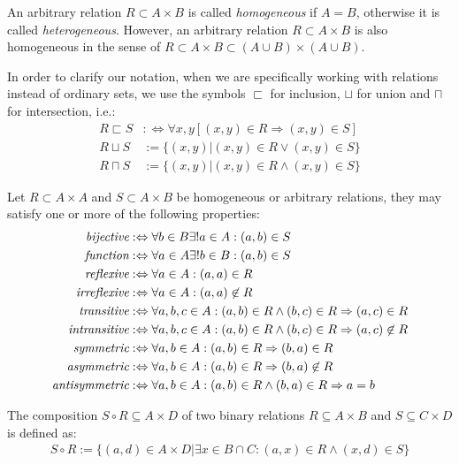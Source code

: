 An arbitrary relation $R \subset A \times B$ is called \emph{homogeneous} if $A = B$, otherwise it is called \emph{heterogeneous}.
However, an arbitrary relation $R \subset A \times B$ is also homogeneous in the sense of
$R \subset A \times B \subset (A \cup B) \times (A \cup B)$.

In order to clarify our notation, when we are specifically working with relations instead of ordinary sets, we use the symbols
$\sqsubset$ for inclusion, $\sqcup$ for union and $\sqcap$ for intersection, i.e.:
\begin{align}
R \sqsubset S
&:\Leftrightarrow
\forall x,y [(x,y) \in R \Rightarrow (x,y) \in S]
\\
R \sqcup S
&:=
\{ (x,y) | (x,y) \in R \vee (x,y) \in S \}
\\
R \sqcap S
&:=
\{ (x,y) | (x,y) \in R \wedge (x,y) \in S \}
\end{align}

\begin{definition}
Let $R \subset A \times A$ and $S \subset A \times B$ be homogeneous or arbitrary relations, they may satisfy one or more of the following properties:
\begin{align}
\emph{bijective} 
&:\Leftrightarrow
\forall b \in B \exists! a \in A: (a,b) \in S
\\
\emph{function} 
&:\Leftrightarrow
\forall a \in A \exists! b \in B: (a,b) \in S
\\
\emph{reflexive} 
&:\Leftrightarrow
\forall a \in A: (a,a) \in R
\\
\emph{irreflexive} 
&:\Leftrightarrow
\forall a \in A: (a,a) \not\in R
\\
\emph{transitive} 
&:\Leftrightarrow
\forall a,b,c \in A: (a,b) \in R \wedge (b,c) \in R \Rightarrow (a,c) \in R
\\
\emph{intransitive} 
&:\Leftrightarrow
\forall a,b,c \in A: (a,b) \in R \wedge (b,c) \in R \Rightarrow (a,c) \not\in R
\\
\emph{symmetric} 
&:\Leftrightarrow
\forall a,b \in A: (a,b) \in R \Rightarrow (b,a) \in R
\\
\emph{asymmetric} 
&:\Leftrightarrow
\forall a,b \in A: (a,b) \in R \Rightarrow (b,a) \not\in R
\\
\emph{antisymmetric} 
&:\Leftrightarrow
\forall a,b \in A: (a,b) \in R \wedge (b,a) \in R \Rightarrow a = b
\end{align}
\end{definition}

\begin{definition}
The composition $S \circ R \subseteq A \times D$ of two binary relations $R \subseteq A \times B$ and $S \subseteq C \times D$ is defined as:
\begin{align}
S \circ R := \{ (a,d) \in A \times D | \exists x \in B \cap C : (a,x) \in R \wedge (x,d) \in S \}
\end{align}
\end{definition}

